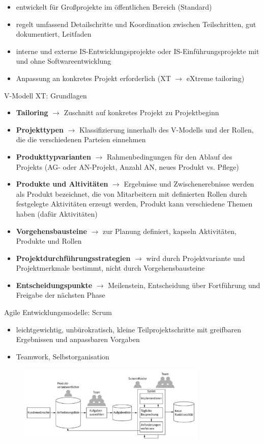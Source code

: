 \begin{itemize}
  \item entwickelt für Großprojekte im öffentlichen Bereich (Standard)
  \item regelt umfassend Detailschritte und Koordination zwischen Teilschritten, gut dokumentiert, Leitfaden
  \item interne und externe IS-Entwicklungsprojekte oder IS-Einführungsprojekte mit und ohne Softwareentwicklung
  \item Anpassung an konkretes Projekt erforderlich (XT $\rightarrow$ eXtreme tailoring)
\end{itemize}

V-Modell XT: Grundlagen

\begin{itemize}
  \item \textbf{Tailoring} $\rightarrow$ Zuschnitt auf konkretes Projekt zu Projektbeginn
  \item \textbf{Projekttypen} $\rightarrow$ Klassifizierung innerhalb des V-Modells und der Rollen, die die verschiedenen Parteien einnehmen
  \item \textbf{Produkttypvarianten} $\rightarrow$ Rahmenbedingungen für den Ablauf des Projekts (AG- oder AN-Projekt, Anzahl AN, neues Produkt vs. Pflege)
  \item \textbf{Produkte und Altivitäten} $\rightarrow$ Ergebnisse und Zwischenerebnisse werden als Produkt bezeichnet, die von Mitarbeitern mit definierten Rollen durch festgelegte Aktivitäten erzeugt werden, Produkt kann verschiedene Themen haben (dafür Aktivitäten)
  \item \textbf{Vorgehensbausteine} $\rightarrow$ zur Planung definiert, kapseln Aktivitäten, Produkte und Rollen
  \item \textbf{Projektdurchführungsstrategien} $\rightarrow$ wird durch Projektvariante und Projektmerkmale bestimmt, nicht durch Vorgehensbausteine
  \item \textbf{Entscheidungspunkte} $\rightarrow$ Meilenstein, Entscheidung über Fortführung und Freigabe der nächsten Phase
\end{itemize}

\clearpage
Agile Entwicklungsmodelle: Scrum

\begin{itemize}
  \item leichtgewichtig, unbürokratisch, kleine Teilprojektschritte mit greifbaren Ergebnissen und anpassbaren Vorgaben
  \item Teamwork, Selbstorganisation
\end{itemize}

\begin{figure}[h]
\centering
\includegraphics[width=0.8\textwidth]{assets/Scrum.png}
\end{figure}
